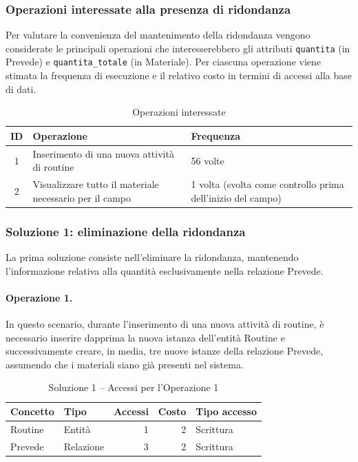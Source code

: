 \documentclass[11pt,a4paper]{article}
\begin{document}
\subsubsection{Operazioni interessate alla presenza di ridondanza}

Per valutare la convenienza del mantenimento della ridondanza vengono considerate le principali
operazioni che interesserebbero gli attributi \texttt{quantita} (in Prevede) e
\texttt{quantita\_totale} (in Materiale). Per ciascuna operazione viene stimata la frequenza di
esecuzione e il relativo costo in termini di accessi alla base di dati.

\begin{table}[h]
\centering
\caption{Operazioni interessate}
\label{tab:operazioni}
\begin{tabular}{@{}clp{}@{}}
\toprule
\textbf{ID} & \textbf{Operazione} & \textbf{Frequenza} \\
\midrule
1 & Inserimento di una nuova attività di routine & 56 volte \\
2 & Visualizzare tutto il materiale necessario per il campo & 1 volta (svolta come controllo
  prima dell'inizio del campo) \\
\bottomrule
\end{tabular}
\end{table}

\subsubsection{Soluzione 1: eliminazione della ridondanza}

La prima soluzione consiste nell'eliminare la ridondanza, mantenendo l'informazione relativa
alla quantità esclusivamente nella relazione Prevede.

\paragraph{Operazione 1.}
In questo scenario, durante l'inserimento di una nuova attività di routine, è necessario
inserire dapprima la nuova istanza dell'entità Routine e successivamente creare, in media, tre
nuove istanze della relazione Prevede, assumendo che i materiali siano già presenti nel sistema.

\begin{table}[h]
\centering
\caption{Soluzione 1 -- Accessi per l'Operazione 1}
\label{tab:sol1-op1}
\begin{tabular}{@{}llrrl@{}}
\toprule
\textbf{Concetto} & \textbf{Tipo} & \textbf{Accessi} & \textbf{Costo} & \textbf{Tipo accesso} \\
\midrule
Routine & Entità    & 1 & 2 & Scrittura \\
Prevede & Relazione & 3 & 2 & Scrittura \\
\bottomrule
\end{tabular}
\end{table}
\end{document}
